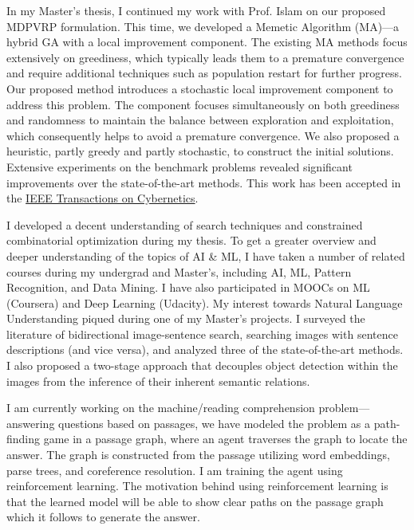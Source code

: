 \documentclass[12pt]{article}
\begin{document}
In my Master's thesis, I continued my work with Prof. Islam on our proposed MDPVRP formulation. This time, we developed a Memetic Algorithm (MA)---a hybrid GA with a local improvement component. The existing MA methods focus extensively on greediness, which typically leads them to a premature convergence and require additional techniques such as population restart for further progress. Our proposed method introduces a stochastic local improvement component to address this problem. The component focuses simultaneously on both greediness and randomness to maintain the balance between exploration and exploitation, which consequently helps to avoid a premature convergence. We also proposed a heuristic, partly greedy and partly stochastic, to construct the initial solutions. Extensive experiments on the benchmark problems revealed significant improvements over the state-of-the-art methods. This work has been accepted in the \href{http://ieeexplore.ieee.org/document/7835722/}{IEEE Transactions on Cybernetics}. 

I developed a decent understanding of search techniques and constrained combinatorial optimization during my thesis. To get a greater overview and deeper understanding of the topics of AI \& ML, I have taken a number of related courses during my undergrad and Master's, including AI, ML, Pattern Recognition, and Data Mining. I have also participated in MOOCs on ML (Coursera) and Deep Learning (Udacity). My interest towards Natural Language Understanding piqued during one of my Master's projects. I surveyed the literature of bidirectional image-sentence search, searching images with sentence descriptions (and vice versa), and analyzed three of the state-of-the-art methods. I also proposed a two-stage approach that decouples object detection within the images from the inference of their inherent semantic relations. 

I am currently working on the machine/reading comprehension problem---answering questions based on passages, we have modeled the problem as a path-finding game in a passage graph, where an agent traverses the graph to locate the answer. The graph is constructed from the passage utilizing word embeddings, parse trees, and coreference resolution. I am training the agent using reinforcement learning. The motivation behind using reinforcement learning is that the learned model will be able to show clear paths on the passage graph which it follows to generate the answer. 
\end{document}
